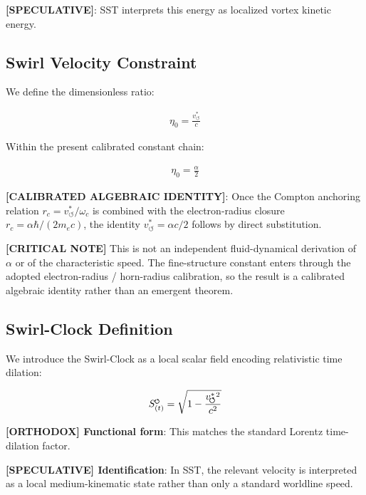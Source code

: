 \documentclass[11pt]{article}
\theoremstyle{definition}
\theoremstyle{plain}
\theoremstyle{remark}
\newcommand{\swirlarrow}{\mathchoice{\mkern-2mu\scriptstyle\boldsymbol{\circlearrowleft}}{\mkern-2mu\scriptstyle\boldsymbol{\circlearrowleft}}{\mkern-2mu\scriptscriptstyle\boldsymbol{\circlearrowleft}}{\mkern-2mu\scriptscriptstyle\boldsymbol{\circlearrowleft}}}
\newcommand{\SwirlClock}{{S_{(t)}^{\swirlarrow}}}
\newcommand{\rc}{{r_c}}
\newcommand{\vchar}{v_{\!\boldsymbol{\circlearrowleft}}^{\ast}}
\begin{document}
        \textbf{[SPECULATIVE]}: SST interprets this energy as localized vortex kinetic energy.
    
    \subsection{Swirl Velocity Constraint}
        
        We define the dimensionless ratio:
        
        \begin{align}
            \eta_0 = \frac{\vchar}{c}
        \end{align}
        
        Within the present calibrated constant chain:
        
        \begin{align}
            \eta_0 = \frac{\alpha}{2}
        \end{align}
        
        \textbf{[CALIBRATED ALGEBRAIC IDENTITY]}: Once the Compton anchoring relation $\rc=\vchar/\omega_c$ is combined with the electron-radius closure $\rc=\alpha\hbar/(2m_ec)$, the identity $\vchar=\alpha c/2$ follows by direct substitution.

        \textbf{[CRITICAL NOTE]} This is not an independent fluid-dynamical derivation of $\alpha$ or of the characteristic speed. The fine-structure constant enters through the adopted electron-radius / horn-radius calibration, so the result is a calibrated algebraic identity rather than an emergent theorem.
    
    \subsection{Swirl-Clock Definition}
        
        We introduce the Swirl-Clock as a local scalar field encoding relativistic time dilation:
        
        \begin{align}
            \SwirlClock = \sqrt{1 - \frac{\vchar{}^2}{c^2}}
            \label{eq:swirl_clock}
        \end{align}
        
        \textbf{[ORTHODOX] Functional form}: This matches the standard Lorentz time-dilation factor.

        \textbf{[SPECULATIVE] Identification}: In SST, the relevant velocity is interpreted as a local medium-kinematic state rather than only a standard worldline speed.
\end{document}
